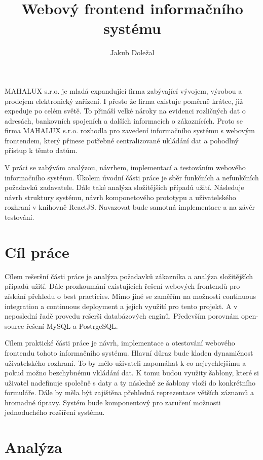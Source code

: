 \documentclass[thesis=B,czech]{FITthesis}[2012/06/26]
\title{Webový frontend informačního systému}
\author{Jakub Doležal} %
\begin{document}

\begin{introduction}
	MAHALUX s.r.o. je mladá expandující firma zabývající vývojem, výrobou a prodejem elektronický zařízení. I přesto že firma existuje poměrně krátce, již expeduje po celém světě. To přináší velké nároky na evidenci rozličných dat o adresách, bankovních spojeních a dalších informacích o zákaznících. Proto se firma MAHALUX s.r.o. rozhodla pro zavedení informačního systému s webovým frontendem, který přinese potřebné centralizované ukládání dat a pohodlný přístup k těmto datům.
	
	V práci se zabývám analýzou, návrhem, implementací a testováním webového informačního systému.
	Úkolem úvodní části práce je sběr funkčních a nefunkčních požadavků zadavatele. Dále také analýza složitějších případů užití.
	Následuje návrh struktury systému, návrh komponetového prototypu a uživatelského rozhraní v knihovně ReactJS. Navazovat bude samotná implementace a na závěr testování.
\end{introduction}

\chapter{Cíl práce}
	Cílem rešeršní části práce je analýza požadavků zákazníka a analýza složitějších případů užití. Dále prozkoumání existujících řešení webových frontendů pro získání přehledu o best practicies. Mimo jiné se zaměřím na možnosti continuous integration a continuous deployment a jejich využití pro tento projekt. A v neposlední řadě provedu rešerši databázových enginů. Především porovnám open-source řešení MySQL a PostrgeSQL.
	
	Cílem praktické části práce je návrh, implementace a otestování webového frontendu tohoto informačního systému. Hlavní důraz bude kladen dynamičnost uživatelského rozhraní. To by mělo uživateli napomáhat k co nejrychlejšímu a pokud možno bezchybnému vkládání dat. K tomu budou využity šablony, které si uživatel nadefinuje společně s daty a ty následně ze šablony vloží do konkrétního formuláře. Dále by měla být zajištěna přehledná reprezentace větších záznamů a hromadné úpravy. Systém bude komponentový pro zaručení možnosti jednoduchého rozšíření systému.
	
\chapter{Analýza}
\end{document}
